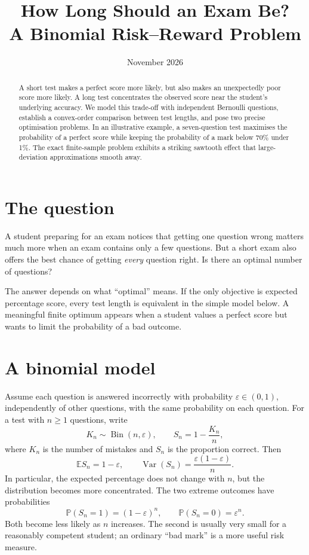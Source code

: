 \documentclass[11pt,a4paper]{article}
\title{\sffamily\bfseries How Long Should an Exam Be?\\[4pt]\large A Binomial Risk--Reward Problem}
\author{}
\date{November 2026}
\newcommand{\Prb}{\mathbb P}
\newcommand{\E}{\mathbb E}
\newcommand{\Var}{\operatorname{Var}}
\newcommand{\Bin}{\operatorname{Bin}}
\begin{document}
\maketitle
\begin{abstract}
A short test makes a perfect score more likely, but also makes an unexpectedly poor score more likely. A long test concentrates the observed score near the student's underlying accuracy. We model this trade-off with independent Bernoulli questions, establish a convex-order comparison between test lengths, and pose two precise optimisation problems. In an illustrative example, a seven-question test maximises the probability of a perfect score while keeping the probability of a mark below 70\% under 1\%. The exact finite-sample problem exhibits a striking sawtooth effect that large-deviation approximations smooth away.
\end{abstract}

\section{The question}
A student preparing for an exam notices that getting one question wrong matters much more when an exam contains only a few questions. But a short exam also offers the best chance of getting \emph{every} question right. Is there an optimal number of questions?

The answer depends on what ``optimal'' means. If the only objective is expected percentage score, every test length is equivalent in the simple model below. A meaningful finite optimum appears when a student values a perfect score but wants to limit the probability of a bad outcome.

\section{A binomial model}
Assume each question is answered incorrectly with probability $\varepsilon\in(0,1)$, independently of other questions, with the same probability on each question. For a test with $n\geq1$ questions, write
\begin{equation}
 K_n\sim\Bin(n,\varepsilon),\qquad S_n=1-\frac{K_n}{n},
 \label{eq:model}
\end{equation}
where $K_n$ is the number of mistakes and $S_n$ is the proportion correct. Then
\begin{equation}
 \E S_n=1-\varepsilon,\qquad
 \Var(S_n)=\frac{\varepsilon(1-\varepsilon)}{n}.
\end{equation}
In particular, the expected percentage does not change with $n$, but the distribution becomes more concentrated. The two extreme outcomes have probabilities
\begin{equation}
 \Prb(S_n=1)=(1-\varepsilon)^n,\qquad
 \Prb(S_n=0)=\varepsilon^n.
 \label{eq:extremes}
\end{equation}
Both become less likely as $n$ increases. The second is usually very small for a reasonably competent student; an ordinary ``bad mark'' is a more useful risk measure.
\end{document}

